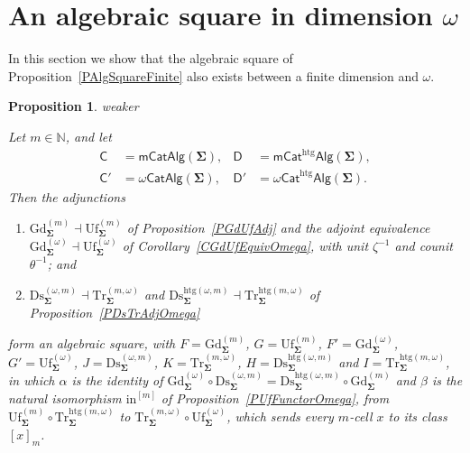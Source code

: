 \documentclass[a4paper, reqno]{amsbook}
\makeatletter
\newcommand{\sig}[1]{\mathbf{#1}}             %
\newcommand{\htg}{\mathrm{htg}}                %
\newcommand{\Gd}{\mathrm{Gd}}
\newcommand{\Uf}{\mathrm{Uf}}
\newcommand{\Ds}{\mathrm{Ds}}
\newcommand{\Tr}{\mathrm{Tr}}
\theoremstyle{plain}
\newtheorem{proposition}[theorem]{Proposition}
\theoremstyle{definition}
\newcommand*{\CA@leanpending}{}
\newcommand*{\CA@leanrelation}{}
\newcommand*{\lean}[2]{%
  \ifcsname\string\color@lean@#1\endcsname\else
    \PackageError{main}{Unknown relation `#1' in \string\lean}{Use equivalent, weaker or stronger.}%
  \fi
  \gdef\CA@leanrelation{#1}%
  \gdef\CA@leanpending{#2}}
\makeatother
\begin{document}
\section{An algebraic square in dimension \texorpdfstring{$\omega$}{omega}}\label{SAlgSquareOmega}

In this section we show that the algebraic square of Proposition~\ref{PAlgSquareFinite} also exists between a finite dimension and $\omega$.

\begin{proposition}\label{PAlgSquareOmega}\lean{weaker}{Omega.dimensionAlgebraicSquare}
Let $m\in\mathbb{N}$, and let
$$
\begin{aligned}
\mathsf{C}&=\mathsf{mCatAlg}(\sig{\Sigma}), &
\mathsf{D}&=\mathsf{mCat}^{\htg}\mathsf{Alg}(\sig{\Sigma}),\\
\mathsf{C}'&=\omega\mathsf{CatAlg}(\sig{\Sigma}), &
\mathsf{D}'&=\omega\mathsf{Cat}^{\htg}\mathsf{Alg}(\sig{\Sigma}).
\end{aligned}
$$
Then the adjunctions
\begin{enumerate}
\item $\Gd^{(m)}_{\sig{\Sigma}}\dashv\Uf^{(m)}_{\sig{\Sigma}}$ of Proposition~\ref{PGdUfAdj} and the adjoint equivalence $\Gd^{(\omega)}_{\sig{\Sigma}}\dashv\Uf^{(\omega)}_{\sig{\Sigma}}$ of Corollary~\ref{CGdUfEquivOmega}, with unit $\zeta^{-1}$ and counit $\theta^{-1}$; and
\item $\Ds^{(\omega,m)}_{\sig{\Sigma}}\dashv \Tr^{(m,\omega)}_{\sig{\Sigma}}$ and $\Ds^{\htg(\omega,m)}_{\sig{\Sigma}}\dashv \Tr^{\htg(m,\omega)}_{\sig{\Sigma}}$ of Proposition~\ref{PDsTrAdjOmega}
\end{enumerate}
form an algebraic square, with $F=\Gd^{(m)}_{\sig{\Sigma}}$, $G=\Uf^{(m)}_{\sig{\Sigma}}$, $F'=\Gd^{(\omega)}_{\sig{\Sigma}}$, $G'=\Uf^{(\omega)}_{\sig{\Sigma}}$, $J=\Ds^{(\omega,m)}_{\sig{\Sigma}}$, $K=\Tr^{(m,\omega)}_{\sig{\Sigma}}$, $H=\Ds^{\htg(\omega,m)}_{\sig{\Sigma}}$ and $I=\Tr^{\htg(m,\omega)}_{\sig{\Sigma}}$, in which $\alpha$ is the identity of $\Gd^{(\omega)}_{\sig{\Sigma}}\circ\Ds^{(\omega,m)}_{\sig{\Sigma}}=\Ds^{\htg(\omega,m)}_{\sig{\Sigma}}\circ\Gd^{(m)}_{\sig{\Sigma}}$ and $\beta$ is the natural isomorphism $\mathrm{in}^{[m]}$ of Proposition~\ref{PUfFunctorOmega}, from $\Uf^{(m)}_{\sig{\Sigma}}\circ \Tr^{\htg(m,\omega)}_{\sig{\Sigma}}$ to $\Tr^{(m,\omega)}_{\sig{\Sigma}}\circ\Uf^{(\omega)}_{\sig{\Sigma}}$, which sends every $m$-cell $x$ to its class $[x]_{m}$.
\end{proposition}
\end{document}

